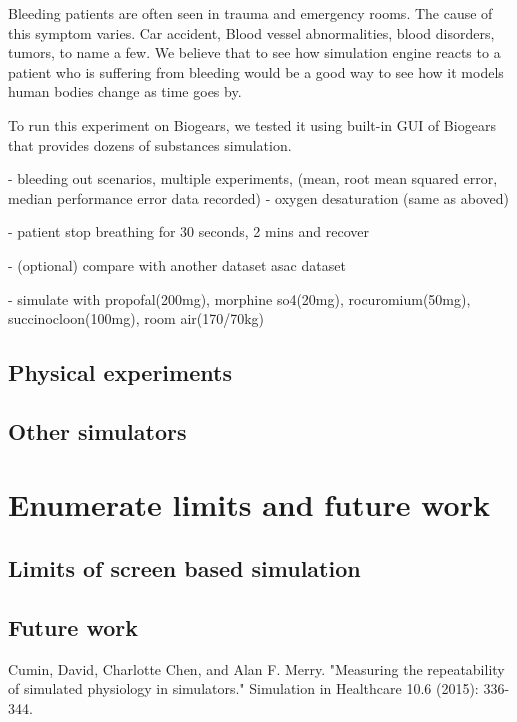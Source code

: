 \documentclass[a4paper]{article}
\begin{document}
Bleeding patients are often seen in trauma and emergency rooms. The cause of this symptom varies. Car accident, Blood vessel abnormalities, blood disorders, tumors, to name a few. We believe that to see how simulation engine reacts to a patient who is suffering from bleeding would be a good way to see how it models human bodies change as time goes by.

To run this experiment on Biogears, we tested it using built-in GUI of Biogears that provides dozens of substances simulation.  

- bleeding out scenarios, multiple experiments, (mean, root mean squared error, median performance error data recorded)
- oxygen desaturation (same as aboved)

- patient stop breathing for 30 seconds, 2 mins and recover

- (optional) compare with another dataset asac dataset

- simulate with propofal(200mg), morphine so4(20mg), rocuromium(50mg), succinocloon(100mg), room air(170/70kg)

\subsection{Physical experiments}
\subsection{Other simulators}

\section{Enumerate limits and future work}
\subsection{Limits of screen based simulation}
\subsection{Future work}

\begin{thebibliography}{1}

   Cumin, David, Charlotte Chen, and Alan F. Merry. "Measuring the repeatability of simulated physiology in simulators." Simulation in Healthcare 10.6 (2015): 336-344.




  \end{thebibliography}
\end{document}
